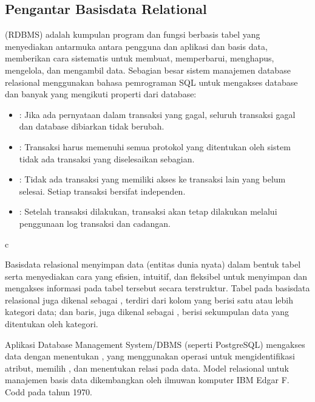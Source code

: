 \documentclass[letterpaper,10pt,english]{sphinxmanual}
\begin{document}
\subsection{Pengantar Basisdata Relational}
\label{\detokenize{sesi2/relationaldb:pengantar-basisdata-relational}}
 (RDBMS) adalah kumpulan program dan fungsi berbasis tabel yang menyediakan antarmuka antara pengguna dan aplikasi dan basis data, memberikan cara sistematis untuk membuat, memperbarui, menghapus, mengelola, dan mengambil data. Sebagian besar sistem manajemen database relasional menggunakan bahasa pemrograman SQL untuk mengakses database dan banyak yang mengikuti properti  dari database:
\begin{itemize}
\item {} 
: Jika ada pernyataan dalam transaksi yang gagal, seluruh transaksi gagal dan database dibiarkan tidak berubah.

\item {} 
: Transaksi harus memenuhi semua protokol yang ditentukan oleh sistem \sphinxhyphen{} tidak ada transaksi yang diselesaikan sebagian.

\item {} 
: Tidak ada transaksi yang memiliki akses ke transaksi lain yang belum selesai. Setiap transaksi bersifat independen.

\item {} 
: Setelah transaksi dilakukan, transaksi akan tetap dilakukan melalui penggunaan log transaksi dan cadangan.

\end{itemize}

c

Basisdata relasional menyimpan data (entitas dunia nyata) dalam bentuk tabel serta menyediakan cara yang efisien, intuitif, dan fleksibel untuk menyimpan dan mengakses informasi pada tabel tersebut secara terstruktur. Tabel pada basisdata relasional juga dikenal sebagai , terdiri dari kolom yang berisi satu atau lebih kategori data; dan baris, juga dikenal sebagai , berisi sekumpulan data yang ditentukan oleh kategori.

Aplikasi Database Management System/DBMS (seperti PostgreSQL) mengakses data dengan menentukan , yang menggunakan operasi untuk mengidentifikasi atribut, memilih , dan menentukan relasi pada data. Model relasional untuk manajemen basis data dikembangkan oleh ilmuwan komputer IBM Edgar F. Codd pada tahun 1970.
\end{document}
